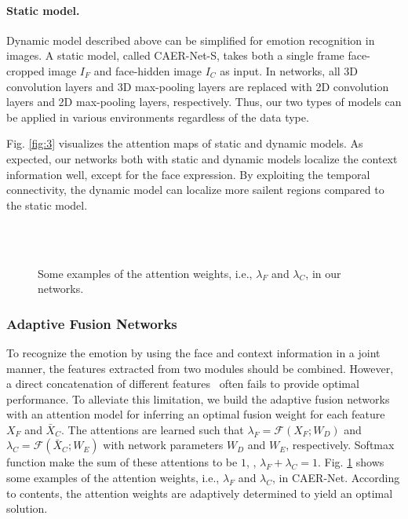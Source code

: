 \documentclass[10pt,twocolumn,letterpaper]{article}
\newcommand{\figref}[1]{Fig. \ref{#1}}
\begin{document}
\paragraph{Static model.}
Dynamic model described above can be simplified for emotion recognition in images. A static model, called CAER-Net-S, takes both a single frame face-cropped image $I_F$ and face-hidden image $I_C$ as input.
In networks, all 3D convolution layers and 3D max-pooling layers are replaced with 2D convolution layers and 2D max-pooling layers, respectively.
Thus, our two types of models can be applied in various environments regardless of the data type.

\figref{fig:3} visualizes the attention maps of static and dynamic models. As expected, our networks both with static and dynamic models localize the context information well, except for the face expression.
By exploiting the temporal connectivity, the dynamic model can localize more sailent regions compared to the static model.


\begin{figure}
	\centering
	\renewcommand{\thesubfigure}{}
	\hfill
	\hfill
	\hfill \\
	\vspace{-5pt}
	\hfill
	\hfill
	\hfill \\
	\caption{Some examples of the attention weights, i.e., $\lambda_F$ and $\lambda_C$, in our networks.}
	\label{fig:4}\vspace{-10pt}
\end{figure}


\subsubsection{Adaptive Fusion Networks}\vspace{-5pt}
To recognize the emotion by using the face and context information in a joint manner, the features extracted from two modules should be combined.
However, a direct concatenation of different features~\cite{kosti2017emotion} often fails to provide optimal performance.
To alleviate this limitation, we build the adaptive fusion networks with an attention model for inferring an optimal fusion weight for each feature $X_F$ and $\bar{X}_C$.
The attentions are learned such that $\lambda_F = \mathcal{F}(X_F; W_D)$ and $\lambda_C = \mathcal{F}(\bar{X}_C; W_E)$ with network parameters $W_D$ and $W_E$, respectively. Softmax function make the sum of these attentions to be $1$, \ie, $\lambda_F + \lambda_C = 1$.
\figref{fig:4} shows some examples of the attention weights, i.e., $\lambda_F$ and $\lambda_C$, in CAER-Net. According to contents, the attention weights are adaptively determined to yield an optimal solution.
\end{document}
